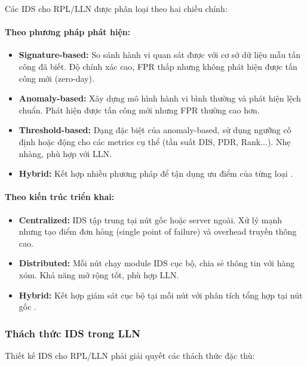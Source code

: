 Các IDS cho RPL/LLN được phân loại theo hai chiều chính:

\paragraph{Theo phương pháp phát hiện:}
\begin{itemize}
    \item \textbf{Signature-based:} So sánh hành vi quan sát được với
          cơ sở dữ liệu mẫu tấn công đã biết. Độ chính xác cao, FPR thấp
          nhưng không phát hiện được tấn công mới (zero-day).
    \item \textbf{Anomaly-based:} Xây dựng mô hình hành vi bình thường
          và phát hiện lệch chuẩn. Phát hiện được tấn công mới nhưng
          FPR thường cao hơn.
    \item \textbf{Threshold-based:} Dạng đặc biệt của anomaly-based,
          sử dụng ngưỡng cố định hoặc động cho các metrics cụ thể (tần
          suất DIS, PDR, Rank...). Nhẹ nhàng, phù hợp với LLN.
    \item \textbf{Hybrid:} Kết hợp nhiều phương pháp để tận dụng ưu
          điểm của từng loại \cite{prajisha2025dis}.
\end{itemize}

\paragraph{Theo kiến trúc triển khai:}
\begin{itemize}
    \item \textbf{Centralized:} IDS tập trung tại nút gốc hoặc server
          ngoài. Xử lý mạnh nhưng tạo điểm đơn hỏng (single point of
          failure) và overhead truyền thông cao.
    \item \textbf{Distributed:} Mỗi nút chạy module IDS cục bộ, chia
          sẻ thông tin với hàng xóm. Khả năng mở rộng tốt, phù hợp LLN.
    \item \textbf{Hybrid:} Kết hợp giám sát cục bộ tại mỗi nút với
          phân tích tổng hợp tại nút gốc \cite{prajisha2025dis}.
\end{itemize}

\subsubsection{Thách thức IDS trong LLN}

Thiết kế IDS cho RPL/LLN phải giải quyết các thách thức đặc thù:

